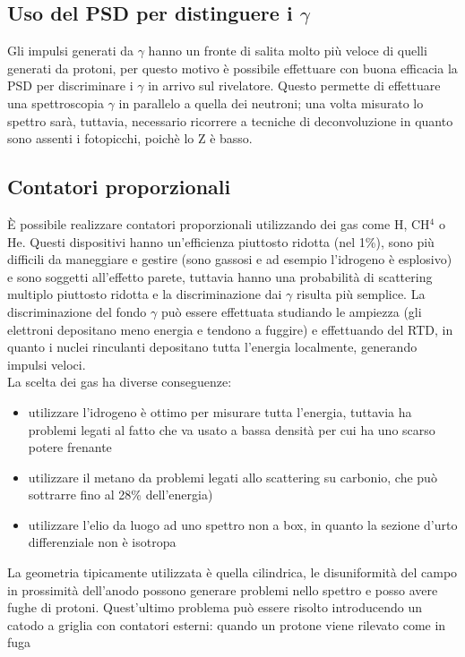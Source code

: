 \subsection{Uso del PSD per distinguere i $\gamma$}
Gli impulsi generati da $\gamma$ hanno un fronte di salita molto pi\`u veloce di quelli generati da protoni, per questo motivo \`e possibile effettuare
con buona efficacia la PSD per discriminare i $\gamma$ in arrivo sul rivelatore.
Questo permette di effettuare una spettroscopia $\gamma$ in parallelo a quella dei neutroni;
una volta misurato lo spettro sar\`a, tuttavia, necessario ricorrere a tecniche di deconvoluzione in quanto sono assenti i fotopicchi, poich\`e lo Z \`e basso.
\subsection{Contatori proporzionali}
\`E possibile realizzare contatori proporzionali utilizzando dei gas come H, CH$^4$ o He.
Questi dispositivi hanno un'efficienza piuttosto ridotta (nel 1\%), sono pi\`u difficili da maneggiare e gestire (sono gassosi e ad esempio l'idrogeno \`e esplosivo)
e sono soggetti all'effetto parete, tuttavia hanno una probabilit\`a di scattering multiplo piuttosto ridotta e la discriminazione dai $\gamma$ risulta pi\`u semplice.
La discriminazione del fondo $\gamma$ pu\`o essere effettuata studiando le ampiezza (gli elettroni depositano meno energia e tendono a fuggire)
e effettuando del RTD, in quanto i nuclei rinculanti depositano tutta l'energia localmente, generando impulsi veloci.\\
La scelta dei gas ha diverse conseguenze:
\begin{itemize}
\item utilizzare l'idrogeno \`e ottimo per misurare tutta l'energia, tuttavia ha problemi legati al fatto che va usato a bassa densit\`a per cui ha uno scarso potere frenante
\item utilizzare il metano da problemi legati allo scattering su carbonio, che pu\`o sottrarre fino al 28\% dell'energia)
\item utilizzare l'elio da luogo ad uno spettro non a box, in quanto la sezione d'urto differenziale non \`e isotropa
\end{itemize}
La geometria tipicamente utilizzata \`e quella cilindrica, le disuniformit\`a del campo in prossimit\`a dell'anodo possono generare problemi nello spettro
e posso avere fughe di protoni. 
Quest'ultimo problema pu\`o essere risolto introducendo un catodo a griglia con contatori esterni: quando un protone viene rilevato come in fuga
